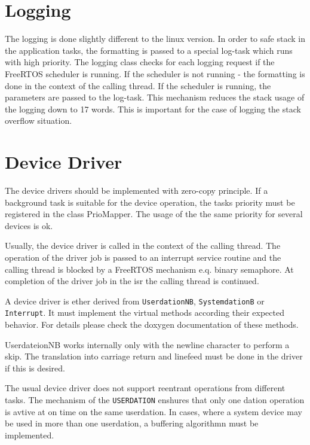 \section{Logging}
The logging is done slightly different to the linux version.
In order to safe stack in the application tasks, the formatting is passed
to a special log-task which runs with high priority.
The logging class checks for each logging request if the FreeRTOS scheduler
is running. If the scheduler is not running - the formatting is done in the 
context of the calling thread. If the scheduler is running, the parameters
are passed to the log-task.
This mechanism reduces the stack usage of the logging down to 17 words. This
is important for the case of logging the stack overflow situation.

\section{Device Driver}
The device drivers should be implemented with zero-copy principle.
If a background task is suitable for the device operation, the 
tasks priority must be registered in the class PrioMapper. The usage
of the the same priority for several devices is ok.

Usually, the device driver is called in the context of the calling thread.
The operation of the driver job is passed to an interrupt service routine and
the calling thread is blocked by a FreeRTOS mechanism e.q. binary semaphore.
At completion of the driver job in the isr the calling thread is continued.

A device driver is ether derived from \verb|UserdationNB|,
 \verb|SystemdationB| or \verb|Interrupt|.
It must implement the virtual methods according their
expected behavior. For details please check the doxygen documentation
of these methods.

UserdateionNB works internally only with the newline character to 
perform a skip. The translation into carriage return and linefeed must
be done in the driver if this is desired.

The usual device driver does not support reentrant operations from
different  tasks. 
The mechanism of the \verb|USERDATION| enshures that only one dation
operation is avtive at on time on the same userdation. In cases, where
a system device may be used in more than one userdation, a buffering
algorithmn must be implemented. 

